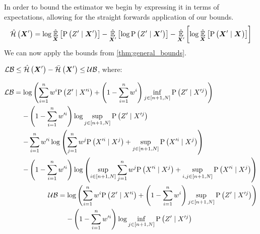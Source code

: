 In order to bound the estimator we begin by expressing it in terms of expectations, allowing for the straight forwards application of our bounds.
\begin{equation}
		\hat{\mathcal{H}}\left({\boldsymbol X_{}^\prime}\right)=\log\operatorname*{\hat{\operatorname*{\mathbb{E}}}}\limits_{\boldsymbol X_{}}\left[{\mathrm{P}\left({Z_{}^\prime}\mid{\ensuremath{\boldsymbol X_{}}^\prime}\right)}\right]-\operatorname*{\hat{\operatorname*{\mathbb{E}}}}\limits_{\boldsymbol X_{}^\prime}\left[{\log\mathrm{P}\left({Z_{}^\prime}\mid{\ensuremath{\boldsymbol X_{}}^\prime}\right)}\right]-\operatorname*{\hat{\operatorname*{\mathbb{E}}}}\limits_{\boldsymbol X_{}^\prime}\left[{\log\operatorname*{\hat{\operatorname*{\mathbb{E}}}}\limits_{\boldsymbol X_{}}\left[{\mathrm{P}\left({\boldsymbol X_{}^\prime}\mid{\ensuremath{\boldsymbol X_{}}}\right)}\right]}\right]
\end{equation}
We can now apply the bounds from \cref{thm:general_bounds}.
\begin{lemma}
	\label{thm:boers_bounds}
	$\operatorname*{\mathcal{LB}}\leq\hat{\mathcal{H}}\left({\boldsymbol X_{}^\prime}\right)-\bar{\mathcal{H}}_{}\left({\boldsymbol X_{}^\prime}\right)\leq\operatorname*{\mathcal{UB}}$, where:
	\begin{small}
	\begin{subequations}
		\begin{align}
			\begin{split}
				\lowerbound &=\log\left(\sum\limits_{i=1}^n\weight{}{i}\probcond{\observations{}^\prime}{\states{}^{\prime i}}+\left(1-\sum\limits_{i=1}^n\weight{}{i}\right)\inf\limits_{j\in[n+1,N]}\probcond{\observations{}^\prime}{\states{}^{\prime j}}\right) \\
				& \phantomeq-\left(1-\sum_{i=1}^n\weight{}{\prime i}\right)\log\sup_{j\in[n+1,N]}\probcond{\observations{}^\prime}{\states{}^{\prime j}}\\
				&\phantomeq-\sum_{i=1}^n\weight{}{\prime i}\log\left(\sum_{j=1}^n\weight{}{j}\probcond{\states{}^{\prime i}}{\states{}^j}+\sup_{j\in[n+1,N]}\probcond{\states{}^{\prime i}}{\states{}^j}\right)\\
				& \phantomeq-\left(1-\sum_{i=1}^n\weight{}{\prime i}\right)\log\left(\sup_{i\in[n+1,N]}\sum_{j=1}^n\weight{}{j}\probcond{\states{}^{\prime i}}{\states{}^j}+\sup_{i,j\in[n+1,N]}\probcond{\states{}^{\prime i}}{\states{}^j}\right)
			\end{split} \\
			\begin{split}
				\upperbound & =\log\left(\sum\limits_{i=1}^n\weight{}{i}\probcond{\observations{}^\prime}{\states{}^{\prime i}}+\left(1-\sum\limits_{i=1}^n\weight{}{i}\right)\sup\limits_{j\in[n+1,N]}\probcond{\observations{}^\prime}{\states{}^{\prime j}}\right) \\
				& \phantomeq-\left(1-\sum_{i=1}^n\weight{}{\prime i}\right)\log\inf_{j\in[n+1,N]}\probcond{\observations{}^\prime}{\states{}^{\prime j}}\\

\end{split}
\end{align}
\end{subequations}
\end{small}
\end{lemma}
